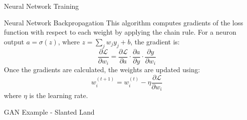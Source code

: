 \documentclass{beamer}
\begin{document}
\begin{frame}{Neural Network Training}
    \begin{block}{Neural Network Backpropagation}
    This algorithm computes gradients of the loss function with respect to each weight by applying the chain rule. For a neuron output \( a = \sigma(z) \), where \( z = \sum_j w_j y_j + b \), the gradient is:
\[
\frac{\partial \mathcal{L}}{\partial w_i} = \frac{\partial \mathcal{L}}{\partial a} \cdot \frac{\partial a}{\partial y} \cdot \frac{\partial y}{\partial w_i}
\]
Once the gradients are calculated, the weights are updated using:
\[
w^{(t+1)}_i= w^{(t)}_i - \eta \frac{\partial \mathcal{L}}{\partial w_i}
\]
where \( \eta \) is the learning rate.

\end{block}
    
\end{frame}

\begin{frame}{GAN Example - Slanted Land} 
    \begin{figure}[h]
        \centering
        \captionsetup{labelformat=empty}
    \end{figure}
\end{frame}
\end{document}
